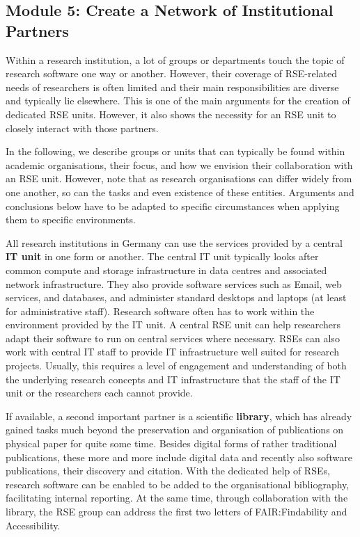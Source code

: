 \documentclass[a4paper]{article}
\begin{document}
\subsection{Module 5: Create a Network of Institutional Partners}%
\label{sec:partners}

Within a research institution, a lot of groups or departments touch the topic of research software one way or another.
However, their coverage of RSE-related needs of researchers is often limited and their main responsibilities are diverse and typically lie elsewhere.
This is one of the main arguments for the creation of dedicated RSE units.
However, it also shows the necessity for an RSE unit to closely interact with those partners.

In the following, we describe groups or units that can typically be found within academic organisations, their focus, and how we envision their collaboration with an RSE unit.
However, note that as research organisations can differ widely from one another, so can the tasks and even existence of these entities.
Arguments and conclusions below have to be adapted to specific circumstances when applying them to specific environments.

All research institutions in Germany can use the services provided by a central \textbf{IT unit} in one form or another.
The central IT unit typically looks after common compute and storage infrastructure in data centres and associated network infrastructure.
They also provide software services such as Email, web services, and databases, and administer standard desktops and laptops (at least for administrative staff).
Research software often has to work within the environment provided by the IT unit.
A central RSE unit can help researchers adapt their software to run on central services where necessary.
RSEs can also work with central IT staff to provide IT infrastructure well suited for research projects.
Usually, this requires a level of engagement and understanding of both the underlying research concepts and IT infrastructure that the staff of the IT unit or the researchers each cannot provide.

If available, a second important partner is a scientific \textbf{library}, which has already gained tasks much beyond the preservation and organisation of publications on physical paper for quite some time.
Besides digital forms of rather traditional publications, these more and more include digital data and recently also software publications, their discovery and citation.
With the dedicated help of RSEs, research software can be enabled to be added to the organisational bibliography, facilitating internal reporting.
At the same time, through collaboration with the library, the RSE group can address the first two letters of FAIR:\@ Findability and Accessibility.
\end{document}
